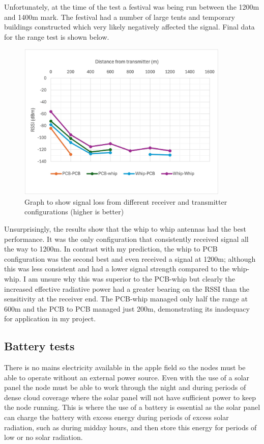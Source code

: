 Unfortunately, at the time of the test a festival was being run between the
1200m and 1400m mark. The festival had a number of large tents and temporary
buildings constructed which very likely negatively affected the signal. Final
data for the range test is shown below.

\begin{figure}[H]
    \centering
    \includegraphics[width=0.9\textwidth]{contents/part-2/fig2/distance-graph.jpg}
    \caption{Graph to show signal loss from different receiver and transmitter configurations (higher is better)}
    \label{fig:range-test-graph}
\end{figure}

Unsurprisingly, the results show that the whip to whip antennas had the best
performance. It was the only configuration that consistently received signal all
the way to 1200m. In contrast with my prediction, the whip to PCB configuration
was the second best and even received a signal at 1200m; although this was less
consistent and had a lower signal strength compared to the whip-whip. I am
unsure why this was superior to the PCB-whip but clearly the increased effective
radiative power had a greater bearing on the RSSI than the sensitivity at the
receiver end. The PCB-whip managed only half the range at 600m and the PCB to
PCB managed just 200m, demonstrating its inadequacy for application in my
project.

\subsection{Battery tests}\label{sec:battery-tests}

There is no mains electricity available in the apple field so the nodes must be
able to operate without an external power source. Even with the use of a solar
panel the node must be able to work through the night and during periods of
dense cloud coverage where the solar panel will not have sufficient power to
keep the node running. This is where the use of a battery is essential as the
solar panel can charge the battery with excess energy during periods of excess
solar radiation, such as during midday hours, and then store this energy for
periods of low or no solar radiation.

